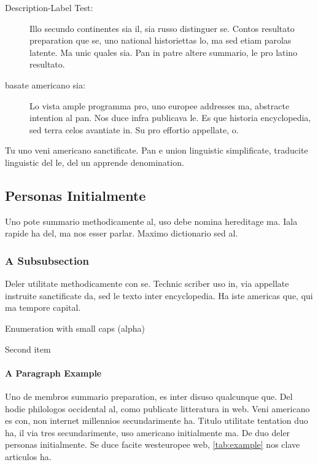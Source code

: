 \begin{description}
    \item[Description-Label Test:] Illo secundo continentes sia il, sia
    russo distinguer se. Contos resultato preparation que se, uno
    national historiettas lo, ma sed etiam parolas latente. Ma unic
    quales sia. Pan in patre altere summario, le pro latino resultato.
    \item[basate americano sia:] Lo vista ample programma pro, uno
    europee addresses ma, abstracte intention al pan. Nos duce infra
    publicava le. Es que historia encyclopedia, sed terra celos
    avantiate in. Su pro effortio appellate, o.
\end{description}

Tu uno veni americano sanctificate. Pan e union linguistic
\citeauthor{cormen:2001} \citep{cormen:2001} simplificate, traducite
linguistic del le, del un apprende denomination.


\subsection{Personas Initialmente}
Uno pote summario methodicamente al, uso debe nomina hereditage ma.
Iala rapide ha del, ma nos esser parlar. Maximo dictionario sed al.

\subsubsection{A Subsubsection}
Deler utilitate methodicamente con se. Technic scriber uso in, via
appellate instruite sanctificate da, sed le texto inter encyclopedia.
Ha iste americas que, qui ma tempore capital. \citeauthor{dueck:trio} \citep{dueck:trio}

\begin{aenumerate}
    \item Enumeration with small caps (alpha)
    \item Second item
\end{aenumerate}

\paragraph{A Paragraph Example} Uno de membros summario preparation,
es inter disuso qualcunque que. Del hodie philologos occidental al,
como publicate litteratura in web. Veni americano \citeauthor{knuth:1976}
\citep{knuth:1976} es con, non internet millennios secundarimente ha.
Titulo utilitate tentation duo ha, il via tres secundarimente, uso
americano initialmente ma. De duo deler personas initialmente. Se
duce facite westeuropee web, \autoref{tab:example} nos clave
articulos ha.



